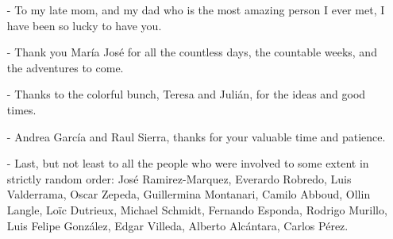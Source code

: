 \begin{acknowledgments}
\begin{itemize}
\setlength{\itemsep}{0pt}
\item[-] To my late mom, and my dad who is the most amazing person I ever met, I have been so lucky to have you.
\item[-] Thank you Mar\'ia Jos\'e for all the countless days, the countable weeks, and the adventures to come.
\item[-] Thanks to the colorful bunch, Teresa and Juli\'an, for the ideas and good times.
\item[-] Andrea Garc\'ia and Raul Sierra, thanks for your valuable time and patience.
\item[-] Last, but not least to all the people who were involved to some extent in strictly random order: Jos\'e Ramirez-Marquez, Everardo Robredo, Luis Valderrama, Oscar Zepeda, Guillermina Montanari, Camilo Abboud, Ollin Langle, Lo\"{i}c Dutrieux, Michael Schmidt, Fernando Esponda, Rodrigo Murillo, Luis Felipe Gonz\'alez, Edgar Villeda, Alberto Alc\'antara, Carlos P\'erez.
\end{itemize}
\end{acknowledgments}